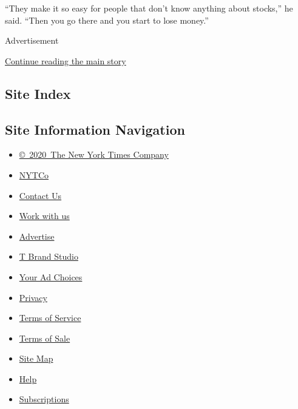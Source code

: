 ``They make it so easy for people that don't know anything about
stocks,'' he said. ``Then you go there and you start to lose money.''

Advertisement

\protect\hyperlink{after-bottom}{Continue reading the main story}

\hypertarget{site-index}{%
\subsection{Site Index}\label{site-index}}

\hypertarget{site-information-navigation}{%
\subsection{Site Information
Navigation}\label{site-information-navigation}}

\begin{itemize}
\tightlist
\item
  \href{https://help.nytimes.com/hc/en-us/articles/115014792127-Copyright-notice}{©~2020~The
  New York Times Company}
\end{itemize}

\begin{itemize}
\tightlist
\item
  \href{https://www.nytco.com/}{NYTCo}
\item
  \href{https://help.nytimes.com/hc/en-us/articles/115015385887-Contact-Us}{Contact
  Us}
\item
  \href{https://www.nytco.com/careers/}{Work with us}
\item
  \href{https://nytmediakit.com/}{Advertise}
\item
  \href{http://www.tbrandstudio.com/}{T Brand Studio}
\item
  \href{https://www.nytimes.com/privacy/cookie-policy\#how-do-i-manage-trackers}{Your
  Ad Choices}
\item
  \href{https://www.nytimes.com/privacy}{Privacy}
\item
  \href{https://help.nytimes.com/hc/en-us/articles/115014893428-Terms-of-service}{Terms
  of Service}
\item
  \href{https://help.nytimes.com/hc/en-us/articles/115014893968-Terms-of-sale}{Terms
  of Sale}
\item
  \href{https://spiderbites.nytimes.com}{Site Map}
\item
  \href{https://help.nytimes.com/hc/en-us}{Help}
\item
  \href{https://www.nytimes.com/subscription?campaignId=37WXW}{Subscriptions}
\end{itemize}
